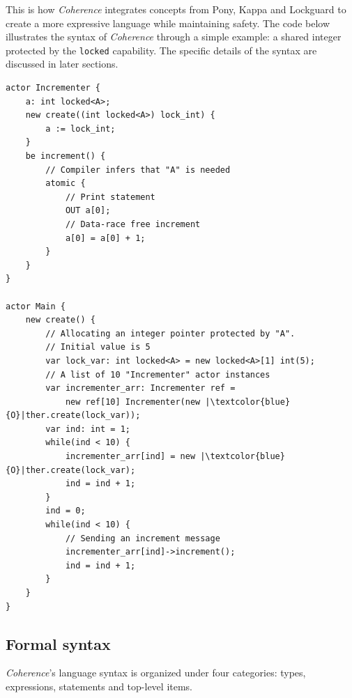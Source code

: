 This is how \textit{Coherence} integrates concepts from Pony, Kappa and Lockguard to create a more expressive language while maintaining safety. The code below illustrates the syntax of \textit{Coherence} through a simple example: a shared integer protected by the \texttt{locked} capability. The specific details of the syntax are discussed in later sections.

\begin{verbatim}
actor Incrementer {
    a: int locked<A>;
    new create((int locked<A>) lock_int) {
        a := lock_int;
    }
    be increment() {
        // Compiler infers that "A" is needed
        atomic { 
            // Print statement
            OUT a[0];
            // Data-race free increment
            a[0] = a[0] + 1;
        }
    }
}

actor Main {
    new create() {
        // Allocating an integer pointer protected by "A".
        // Initial value is 5 
        var lock_var: int locked<A> = new locked<A>[1] int(5);
        // A list of 10 "Incrementer" actor instances
        var incrementer_arr: Incrementer ref = 
            new ref[10] Incrementer(new |\textcolor{blue}{O}|ther.create(lock_var));
        var ind: int = 1;
        while(ind < 10) {
            incrementer_arr[ind] = new |\textcolor{blue}{O}|ther.create(lock_var);
            ind = ind + 1;
        }
        ind = 0;
        while(ind < 10) {
            // Sending an increment message
            incrementer_arr[ind]->increment();
            ind = ind + 1;
        }
    }
}
\end{verbatim}

\subsection{Formal syntax}
\textit{Coherence}'s language syntax is organized under four categories: types, expressions, statements and top-level items.
